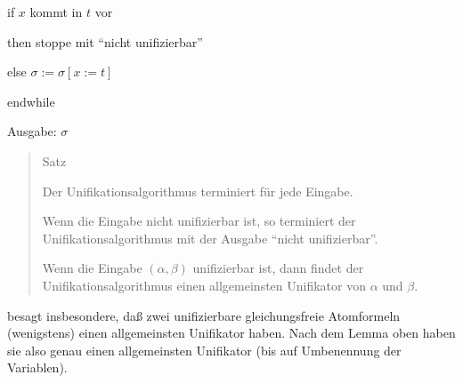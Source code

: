 \documentclass[a4paper]{article}
\begin{document}
\begin{multicols}{3}
\begin{itemize*}
          \begin{itemize*}
            \item
                  if $x$ kommt in $t$ vor
            \item
                  then stoppe mit ``nicht unifizierbar''
            \item
                  else $\sigma:=\sigma[x:=t]$
          \end{itemize*}
    \item
          endwhile
    \item
          Ausgabe: $\sigma$
  \end{itemize*}

  \begin{quote}
    Satz

    \begin{itemize*}
      \item
            \begin{enumerate*}
              \def\labelenumi{(\Alph{enumi})}
              \item
                    Der Unifikationsalgorithmus terminiert für jede Eingabe.
            \end{enumerate*}
      \item
            \begin{enumerate*}
              \def\labelenumi{(\Alph{enumi})}
              \setcounter{enumi}{1}
              \item
                    Wenn die Eingabe nicht unifizierbar ist, so terminiert der
                    Unifikationsalgorithmus mit der Ausgabe ``nicht unifizierbar''.
            \end{enumerate*}
      \item
            \begin{enumerate*}
              \def\labelenumi{(\Alph{enumi})}
              \setcounter{enumi}{2}
              \item
                    Wenn die Eingabe $(\alpha,\beta)$ unifizierbar ist, dann findet der
                    Unifikationsalgorithmus einen allgemeinsten Unifikator von $\alpha$
                    und $\beta$.
            \end{enumerate*}
    \end{itemize*}
  \end{quote}

  \begin{enumerate*}
    \def\labelenumi{(\Alph{enumi})}
    \setcounter{enumi}{2}
    \itemsep1pt\parskip0pt
    \item
          besagt insbesondere, daß zwei unifizierbare gleichungsfreie
          Atomformeln (wenigstens) einen allgemeinsten Unifikator haben. Nach
          dem Lemma oben haben sie also genau einen allgemeinsten Unifikator
          (bis auf Umbenennung der Variablen).
  \end{enumerate*}


\end{multicols}
\end{document}
